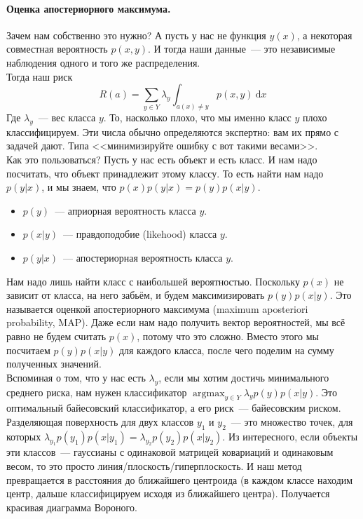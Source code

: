 \documentclass{article}
\begin{document}
    \paragraph{Оценка апостериорного максимума.}
    Зачем нам собственно это нужно? А пусть у нас не функция $y(x)$, а некоторая совместная вероятность $p(x,y)$. И тогда наши данные~--- это независимые наблюдения одного и того же распределения.\\
    Тогда наш риск
    \[
    R(a)=\sum\limits_{y\in Y}\lambda_y\int_{a(x)\neq y}p(x,y)~\mathrm dx
    \]
    Где $\lambda_y$~--- вес класса $y$. То, насколько плохо, что мы именно класс $y$ плохо классифицируем. Эти числа обычно определяются экспертно: вам их прямо с задачей дают. Типа <<минимизируйте ошибку с вот такими весами>>.\\
    Как это пользоваться? Пусть у нас есть объект и есть класс. И нам надо посчитать, что объект принадлежит этому классу. То есть найти нам надо $p(y|x)$, и мы знаем, что $p(x)p(y|x)=p(y)p(x|y)$.
    \begin{itemize}
        \item $p(y)$~--- априорная вероятность класса $y$.
        \item $p(x|y)$~--- правдоподобие (likehood) класса $y$.
        \item $p(y|x)$~--- апостериорная вероятность класса $y$.
    \end{itemize}
    Нам надо лишь найти класс с наибольшей вероятностью. Поскольку $p(x)$ не зависит от класса, на него забьём, и будем максимизировать $p(y)p(x|y)$. Это называется оценкой апостериорного максимума (maximum aposteriori probability, MAP). Даже если нам надо получить вектор вероятностей, мы всё равно не будем считать $p(x)$, потому что это сложно. Вместо этого мы посчитаем $p(y)p(x|y)$ для каждого класса, после чего поделим на сумму полученных значений.\\
    Вспоминая о том, что у нас есть $\lambda_y$, если мы хотим достичь минимального среднего риска, нам нужен классификатор $\operatorname*{argmax}_{y\in Y}\lambda_yp(y)p(x|y)$. Это оптимальный байесовский классификатор, а его риск~--- байесовским риском.\\
    Разделяющая поверхность для двух классов $y_1$ и $y_2$~--- это множество точек, для которых $\lambda_{y_1}p(y_1)p(x|y_1)=\lambda_{y_2}p(y_2)p(x|y_2)$. Из интересного, если объекты эти классов~--- гауссианы с одинаковой матрицей ковариаций и одинаковым весом, то это просто линия/плоскость/гиперплоскость. И наш метод превращается в расстояния до ближайшего центроида (в каждом классе находим центр, дальше классифицируем исходя из ближайшего центра). Получается красивая диаграмма Вороного.
\end{document}
